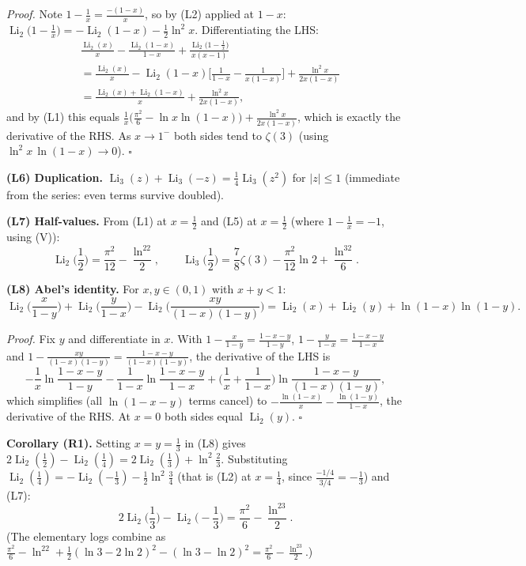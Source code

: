 \documentclass[11pt]{article}
\theoremstyle{remark}
\begin{document}
\textit{Proof.} Note $1-\frac1x=\frac{-(1-x)}{x}$, so by (L2) applied at $1-x$: $\operatorname{Li}_2\big(1-\frac1x\big)=-\operatorname{Li}_2(1-x)-\frac12\ln^2x$. Differentiating the LHS:
\begin{align*}
&\frac{\operatorname{Li}_2(x)}{x}-\frac{\operatorname{Li}_2(1-x)}{1-x}+\frac{\operatorname{Li}_2\big(1-\frac1x\big)}{x(x-1)}\\
&=\frac{\operatorname{Li}_2(x)}{x}-\operatorname{Li}_2(1-x)\Big[\frac1{1-x}-\frac1{x(1-x)}\Big]+\frac{\ln^2x}{2x(1-x)}\\
&=\frac{\operatorname{Li}_2(x)+\operatorname{Li}_2(1-x)}{x}+\frac{\ln^2x}{2x(1-x)},
\end{align*}
and by (L1) this equals $\frac1x\big(\frac{\pi^2}6-\ln x\ln(1-x)\big)+\frac{\ln^2x}{2x(1-x)}$, which is exactly the derivative of the RHS. As $x\to1^-$ both sides tend to $\zeta(3)$ (using $\ln^2x\,\ln(1-x)\to0$). $\square$

\textbf{(L6) Duplication.} $\operatorname{Li}_3(z)+\operatorname{Li}_3(-z)=\tfrac14\operatorname{Li}_3(z^2)$ for $|z|\le1$ (immediate from the series: even terms survive doubled).

\textbf{(L7) Half-values.} From (L1) at $x=\frac12$ and (L5) at $x=\frac12$ (where $1-\frac1x=-1$, using (V)):
\[
\operatorname{Li}_2\!\Big(\frac12\Big)=\frac{\pi^2}{12}-\frac{\ln^22}{2},\qquad
\operatorname{Li}_3\!\Big(\frac12\Big)=\frac{7}{8}\zeta(3)-\frac{\pi^2}{12}\ln2+\frac{\ln^32}{6}.
\]

\textbf{(L8) Abel's identity.} For $x,y\in(0,1)$ with $x+y<1$:
\[
\operatorname{Li}_2\!\Big(\frac{x}{1-y}\Big)+\operatorname{Li}_2\!\Big(\frac{y}{1-x}\Big)-\operatorname{Li}_2\!\Big(\frac{xy}{(1-x)(1-y)}\Big)=\operatorname{Li}_2(x)+\operatorname{Li}_2(y)+\ln(1-x)\ln(1-y).
\]

\textit{Proof.} Fix $y$ and differentiate in $x$. With $1-\frac{x}{1-y}=\frac{1-x-y}{1-y}$, $1-\frac{y}{1-x}=\frac{1-x-y}{1-x}$ and $1-\frac{xy}{(1-x)(1-y)}=\frac{1-x-y}{(1-x)(1-y)}$, the derivative of the LHS is
\[
-\frac{1}{x}\ln\frac{1-x-y}{1-y}-\frac{1}{1-x}\ln\frac{1-x-y}{1-x}+\Big(\frac1x+\frac1{1-x}\Big)\ln\frac{1-x-y}{(1-x)(1-y)},
\]
which simplifies (all $\ln(1-x-y)$ terms cancel) to $-\frac{\ln(1-x)}{x}-\frac{\ln(1-y)}{1-x}$, the derivative of the RHS. At $x=0$ both sides equal $\operatorname{Li}_2(y)$. $\square$

\textbf{Corollary (R1).} Setting $x=y=\frac13$ in (L8) gives $2\operatorname{Li}_2(\frac12)-\operatorname{Li}_2(\frac14)=2\operatorname{Li}_2(\frac13)+\ln^2\frac23$. Substituting $\operatorname{Li}_2(\frac14)=-\operatorname{Li}_2(-\frac13)-\frac12\ln^2\frac34$ (that is (L2) at $x=\frac14$, since $\frac{-1/4}{3/4}=-\frac13$) and (L7):
\begin{equation*}
\boxed{\;2\operatorname{Li}_2\!\Big(\frac13\Big)-\operatorname{Li}_2\!\Big(-\frac13\Big)=\frac{\pi^2}{6}-\frac{\ln^23}{2}.\;}\tag{R1}
\end{equation*}
(The elementary logs combine as $\frac{\pi^2}6-\ln^22+\frac12(\ln3-2\ln2)^2-(\ln3-\ln2)^2=\frac{\pi^2}6-\frac{\ln^23}2$.)
\end{document}

